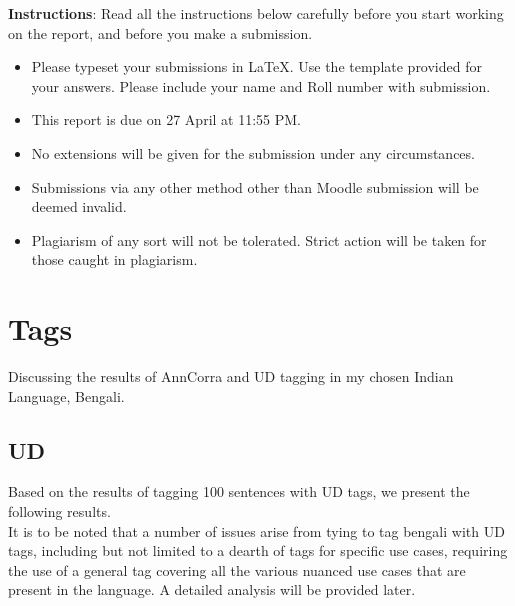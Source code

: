 \documentclass[a4 paper]{article}
\begin{document}

\textbf{Instructions}: Read all the instructions below carefully before you start working on the report, and before you make a submission.
\begin{itemize}
    \item Please typeset your submissions in \LaTeX. Use the template provided for your answers. Please include your name and Roll number with submission. 
    \item This report is due on 27 April at 11:55 PM.
    \item No extensions will be given for the submission under any circumstances.
    \item Submissions via any other method other than Moodle submission will be deemed invalid.
    \item Plagiarism of any sort will not be tolerated. Strict action will be taken for those caught in plagiarism.
\end{itemize}

\section{Tags}

Discussing the results of AnnCorra and UD tagging in my chosen Indian Language,
Bengali.

\subsection{UD}

Based on the results of tagging 100 sentences with UD tags, we present the
following results.\\
It is to be noted that a number of issues arise from tying to tag bengali with
UD tags, including but not limited to a dearth of tags for specific use cases,
requiring the use of a general tag covering all the various nuanced use cases
that are present in the language. A detailed analysis will be provided later.
\end{document}
